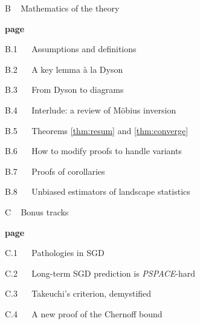 \documentclass[openany, notitlepage, justified]{tufte-book}
\theoremstyle{plain}
\theoremstyle{definition}
\begin{document}
    {\bf
    \par\noindent B ~ Mathematics of the theory}                            \hfill {\bf page \pageref{appendix:math}}
    \par\indent     B.1 ~~ Assumptions and definitions                      \hfill \pageref{appendix:assumptions}
    \par\indent     B.2 ~~ A key lemma \`a la Dyson                         \hfill \pageref{appendix:key-lemma}
    \par\indent     B.3 ~~ From Dyson to diagrams                           \hfill \pageref{appendix:toward-diagrams}
    \par\indent     B.4 ~~ Interlude: a review of M\"obius inversion        \hfill \pageref{appendix:mobius}
    \par\indent     B.5 ~~ Theorems \ref{thm:resum} and \ref{thm:converge}  \hfill \pageref{appendix:resum}
    \par\indent     B.6 ~~ How to modify proofs to handle variants          \hfill \pageref{appendix:prove-variants}
    \par\indent     B.7 ~~ Proofs of corollaries                            \hfill \pageref{appendix:corollaries}
    \par\indent     B.8 ~~ Unbiased estimators of landscape statistics      \hfill \pageref{appendix:bessel}

    {\bf
    \par\noindent C ~ Bonus tracks}                                         \hfill {\bf page \pageref{appendix:bonus}}
    \par\indent     C.1 ~~ Pathologies in SGD                               \hfill \pageref{appendix:pathology}
    \par\indent     C.2 ~~ Long-term SGD prediction is \emph{PSPACE}-hard   \hfill \pageref{appendix:pspace}
    \par\indent     C.3 ~~ Takeuchi's criterion, demystified                \hfill \pageref{appendix:tic}
    \par\indent     C.4 ~~ A new proof of the Chernoff bound                \hfill \pageref{appendix:chernoff}

\renewcommand{\thechapter}{\Alph{chapter}}

\end{document}
